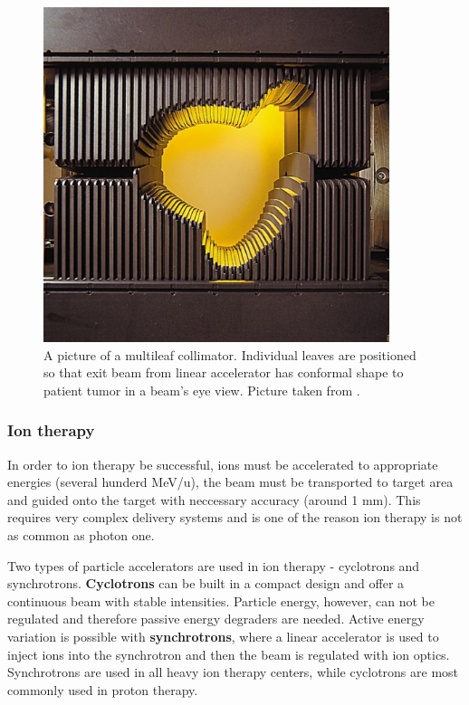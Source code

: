 \documentclass[type=dr, dr=rernat, accentcolor=tud7b,colorbacktitle, bigchapter, openright, twoside, 12pt ]{tudthesis}
\begin{document}
\begin{figure}[H]
\begin{center}
\includegraphics[width=0.9\textwidth]{./Images/MLC.png}
\caption{A picture of a multileaf collimator. Individual leaves are positioned so that exit beam from linear accelerator has conformal shape to patient tumor in a beam's eye view. Picture taken from  \cite{MLC}.}
\label{MLC}
\end{center}
\end{figure}


\subsubsection{Ion therapy}

In order to ion therapy be successful, ions must be accelerated to appropriate energies (several hunderd MeV/u), the beam must be transported to target area and guided
onto the target with neccessary accuracy (around 1 mm). This requires very complex delivery systems and is one of the reason ion therapy is not as common as photon one.

Two types of particle accelerators are used in ion therapy - cyclotrons and synchrotrons. \textbf{Cyclotrons} can be built in a compact design and offer a continuous beam with
stable intensities. Particle energy, however, can not be regulated and therefore passive energy degraders are needed. Active energy variation is possible with \textbf{synchrotrons}, where a linear
accelerator is used to inject ions into the synchrotron and then the beam is regulated with ion optics. Synchrotrons are used in all heavy ion therapy centers, while cyclotrons are most
commonly used in proton therapy.
\end{document}
